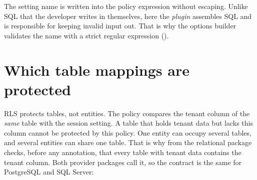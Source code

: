 \begin{important}
  The setting name is written into the policy expression without escaping. Unlike SQL that
  the developer writes in
   themselves, here the
  \emph{plugin} assembles SQL and is responsible for keeping invalid input out. That is why
  the options builder validates the name with a strict regular expression
  ().
\end{important}

\section{Which table mappings are protected}\label{sec:supported-table-mappings}

RLS protects tables, not entities. The policy compares the tenant column of the \emph{same} table
with the session setting. A table that holds tenant data but lacks this column cannot be
protected by this policy. One entity can occupy several tables, and several entities can share
one table. That is why 
from the relational package checks, before any annotation, that every table with tenant data contains
the tenant column. Both provider packages call it, so the contract is the same for PostgreSQL and
SQL Server:

